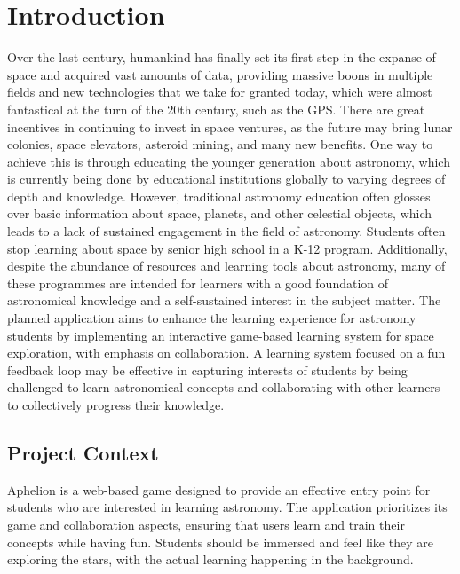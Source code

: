 \chapter{Introduction}


Over the last century, humankind has finally set its first step in the expanse of space and acquired vast amounts of data, 
providing massive boons in multiple fields and new technologies that we take for granted today, which were almost fantastical 
at the turn of the 20th century, such as the GPS. There are great incentives in continuing to invest in space ventures, 
as the future may bring lunar colonies, space elevators, asteroid mining, and many new benefits. One way to achieve this 
is through educating the younger generation about astronomy, which is currently being done by educational institutions 
globally to varying degrees of depth and knowledge. However,  traditional astronomy education often glosses over basic 
information about space, planets, and other celestial objects, which leads to a lack of sustained engagement in the field 
of astronomy. Students often stop learning about space by senior high school in a K-12 program. Additionally, despite the 
abundance of resources and learning tools about astronomy, many of these programmes are intended for learners with a good 
foundation of astronomical knowledge and a self-sustained interest in the subject matter. The planned application aims to 
enhance the learning experience for astronomy students by implementing an interactive game-based learning system for space 
exploration, with emphasis on collaboration. A learning system focused on a fun feedback loop may be effective in capturing 
 interests of students by being challenged to learn astronomical concepts and collaborating with other learners to collectively
  progress their knowledge.



\section{Project Context}

Aphelion is a web-based game designed to provide an effective entry point for students who are interested in learning astronomy. 
The application prioritizes its game and collaboration aspects, ensuring that users learn and train their concepts while having fun. 
Students should be immersed and feel like they are exploring the stars, with the actual learning happening in the background.

